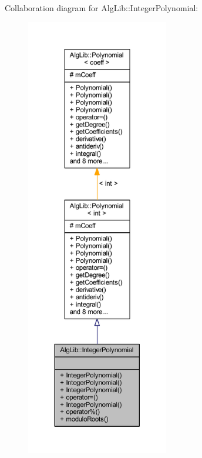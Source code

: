 Collaboration diagram for Alg\+Lib\+:\+:Integer\+Polynomial\+:\nopagebreak
\begin{figure}[H]
\begin{center}
\leavevmode
\includegraphics[height=550pt]{class_alg_lib_1_1_integer_polynomial__coll__graph}
\end{center}
\end{figure}
